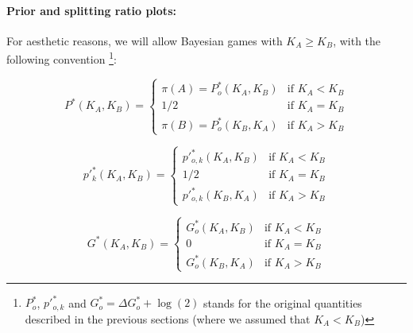 \documentclass{article}
\theoremstyle{definition}
\begin{document}
\paragraph{Prior and splitting ratio plots:}

For aesthetic reasons, we will allow Bayesian games with $K_A \ge K_B$, with the following convention \footnote{$P^*_o$, $p'^*_{o,k}$ and $G^*_o = \Delta G^*_o + \log(2)$ stands for the original quantities described in the previous sections (where we assumed that $K_A<K_B$)}:

\begin{equation}
\label{eq:BPKAKBextended}
    P^*(K_A,K_B) =
        \begin{cases}
        \pi(A) = P^*_o(K_A,K_B) & \text{if } K_A < K_B \\
        1/2                     & \text{if } K_A = K_B \\
        \pi(B) = P^*_o(K_B,K_A) & \text{if } K_A > K_B
    \end{cases}
\end{equation}

\begin{equation}
    p'^*_k(K_A,K_B) =
        \begin{cases}
        p'^*_{o,k}(K_A,K_B) & \text{if } K_A < K_B \\
        1/2              & \text{if } K_A = K_B \\
        p'^*_{o,k}(K_B,K_A) & \text{if } K_A > K_B
    \end{cases}
\end{equation}

\begin{equation}
    G^*(K_A,K_B) =
        \begin{cases}
        G^*_o(K_A,K_B)  & \text{if } K_A < K_B \\
        0                 & \text{if } K_A = K_B \\
        G^*_o(K_B,K_A)  & \text{if } K_A > K_B
    \end{cases}
\end{equation}
\end{document}
